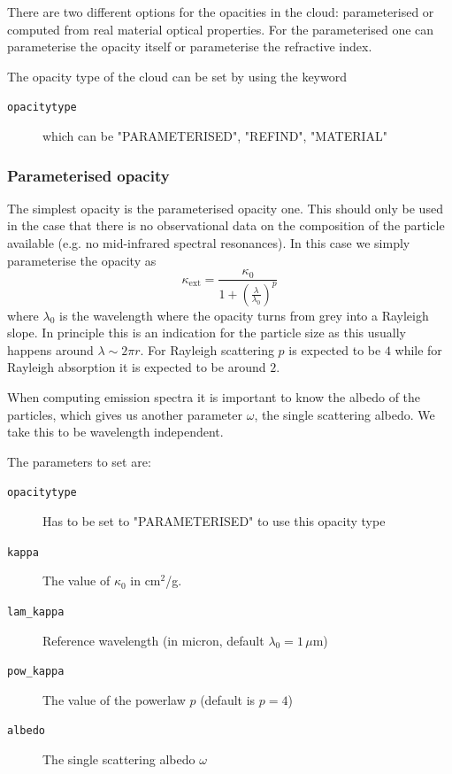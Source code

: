 \documentclass[12pt]{article}
\begin{document}
There are two different options for the opacities in the cloud: parameterised or computed from real material optical properties. For the parameterised one can parameterise the opacity itself or parameterise the refractive index.

The opacity type of the cloud can be set by using the keyword
\begin{description}
\item[\texttt{opacitytype}]
which can be "PARAMETERISED", "REFIND", "MATERIAL"
\end{description}

\subsubsection{Parameterised opacity}

The simplest opacity is the parameterised opacity one. This should only be used in the case that there is no observational data on the composition of the particle available (e.g. no mid-infrared spectral resonances). In this case we simply parameterise the opacity as
\begin{equation}
\label{eq:paropac}
\kappa_\mathrm{ext}=\frac{\kappa_0}{1+\left(\frac{\lambda}{\lambda_0}\right)^{p}}
\end{equation}
where $\lambda_0$ is the wavelength where the opacity turns from grey into a Rayleigh slope. In principle this is an indication for the particle size as this usually happens around $\lambda\sim2\pi r$. For Rayleigh scattering $p$ is expected to be $4$ while for Rayleigh absorption it is expected to be around $2$.

When computing emission spectra it is important to know the albedo of the particles, which gives us another parameter $\omega$, the single scattering albedo. We take this to be wavelength independent.

The parameters to set are:
\begin{description}
\item[\texttt{opacitytype}]
Has to be set to "PARAMETERISED" to use this opacity type
\item[\texttt{kappa}]
The value of $\kappa_0$ in cm$^2$/g.
\item[\texttt{lam\_kappa}]
Reference wavelength (in micron, default $\lambda_0=1\,\mu$m)
\item[\texttt{pow\_kappa}]
The value of the powerlaw $p$ (default is $p=4$)
\item[\texttt{albedo}]
The single scattering albedo $\omega$
\end{description}
\end{document}
